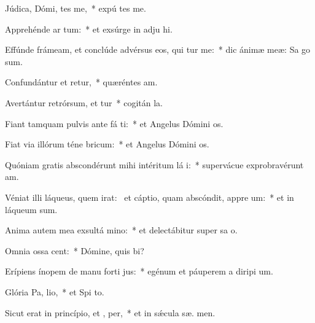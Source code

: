 \item Júdica, Dómi, tes me,~* expú tes me.
\item Apprehénde ar  tum:~* et exsúrge in adju hi.
\item Effúnde frámeam, et conclúde advérsus eos, qui tur me:~* dic ánimæ meæ: Sa  go sum.
\item Confundántur et retur,~* quæréntes  am.
\item Avertántur retrórsum, et tur~* cogitán  la.
\item Fiant tamquam pulvis ante fá ti:~* et Angelus Dómini  os.
\item Fiat via illórum téne  bricum:~* et Angelus Dómini  os.
\item Quóniam gratis abscondérunt mihi intéritum lá i:~* supervácue exprobravérunt  am.
\item Véniat illi láqueus, quem irat:~\pscross{} et cáptio, quam abscóndit, appre um:~* et in láqueum   sum.
\item Anima autem mea exsultá  mino:~* et delectábitur super sa o.
\item Omnia ossa  cent:~* Dómine, quis  bi?
\item Erípiens ínopem de manu forti jus:~* egénum et páuperem a diripi um.
\item Glória Pa,  lio,~* et Spi to.
\item Sicut erat in princípio, et ,  per,~* et in sǽcula sæ. men.
